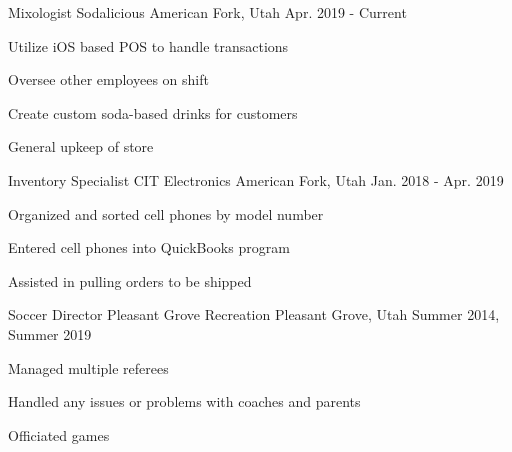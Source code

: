 \begin{cventries}
  \cventry
    {Mixologist} %
    {Sodalicious} %
    {American Fork, Utah} %
    {Apr. 2019 - Current} %
    {
      \begin{cvitems} %
        \item {Utilize iOS based POS to handle transactions}
        \item {Oversee other employees on shift}
        \item {Create custom soda-based drinks for customers}
        \item {General upkeep of store}
      \end{cvitems}
    }

  \cventry
    {Inventory Specialist} %
    {CIT Electronics} %
    {American Fork, Utah} %
    {Jan. 2018 - Apr. 2019} %
    {
      \begin{cvitems} %
        \item {Organized and sorted cell phones by model number}
        \item {Entered cell phones into QuickBooks program}
        \item {Assisted in pulling orders to be shipped}
      \end{cvitems}
    }

  \cventry
    {Soccer Director} %
    {Pleasant Grove Recreation} %
    {Pleasant Grove, Utah} %
    {Summer 2014, Summer 2019} %
    {
      \begin{cvitems} %
        \item {Managed multiple referees}
        \item {Handled any issues or problems with coaches and parents}
        \item {Officiated games}
      \end{cvitems}
    }

\end{cventries}
